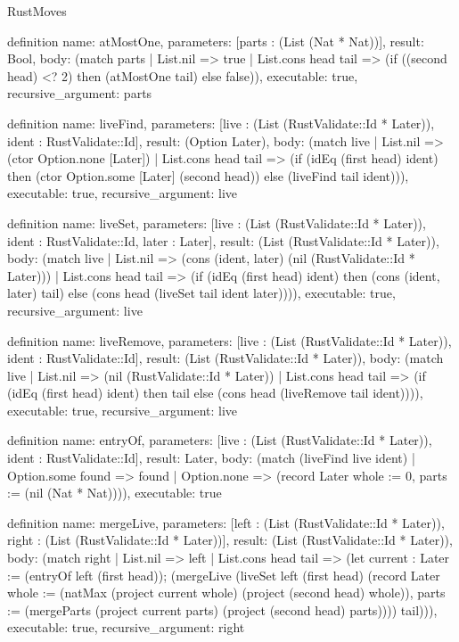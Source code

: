 \begin{lexlean}{RustMoves}
\begin{semanticmodule}
definition{
  name: atMostOne,
  parameters: [parts : (List (Nat * Nat))],
  result: Bool,
  body: (match parts
    | List.nil => true
    | List.cons head tail => (if ((second head) <? 2) then (atMostOne tail) else false)),
  executable: true,
  recursive_argument: parts
}

definition{
  name: liveFind,
  parameters: [live : (List (RustValidate::Id * Later)), ident : RustValidate::Id],
  result: (Option Later),
  body: (match live
    | List.nil => (ctor Option.none [Later])
    | List.cons head tail => (if (idEq (first head) ident) then (ctor Option.some [Later] (second head)) else (liveFind tail ident))),
  executable: true,
  recursive_argument: live
}

definition{
  name: liveSet,
  parameters: [live : (List (RustValidate::Id * Later)), ident : RustValidate::Id, later : Later],
  result: (List (RustValidate::Id * Later)),
  body: (match live
    | List.nil => (cons (ident, later) (nil (RustValidate::Id * Later)))
    | List.cons head tail => (if (idEq (first head) ident) then (cons (ident, later) tail) else (cons head (liveSet tail ident later)))),
  executable: true,
  recursive_argument: live
}

definition{
  name: liveRemove,
  parameters: [live : (List (RustValidate::Id * Later)), ident : RustValidate::Id],
  result: (List (RustValidate::Id * Later)),
  body: (match live
    | List.nil => (nil (RustValidate::Id * Later))
    | List.cons head tail => (if (idEq (first head) ident) then tail else (cons head (liveRemove tail ident)))),
  executable: true,
  recursive_argument: live
}

definition{
  name: entryOf,
  parameters: [live : (List (RustValidate::Id * Later)), ident : RustValidate::Id],
  result: Later,
  body: (match (liveFind live ident)
    | Option.some found => found
    | Option.none => (record Later {whole := 0, parts := (nil (Nat * Nat))})),
  executable: true
}

definition{
  name: mergeLive,
  parameters: [left : (List (RustValidate::Id * Later)), right : (List (RustValidate::Id * Later))],
  result: (List (RustValidate::Id * Later)),
  body: (match right
    | List.nil => left
    | List.cons head tail => (let current : Later := (entryOf left (first head)); (mergeLive (liveSet left (first head) (record Later {whole := (natMax (project current whole) (project (second head) whole)), parts := (mergeParts (project current parts) (project (second head) parts))})) tail))),
  executable: true,
  recursive_argument: right
}


\end{semanticmodule}
\end{lexlean}
